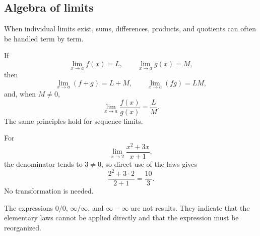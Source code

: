 \subsection{Algebra of limits}

When individual limits exist, sums, differences, products, and quotients can often be handled term by term.

\begin{theorembox}
If
\[
\lim_{x\to a}f(x)=L,
\qquad
\lim_{x\to a}g(x)=M,
\]
then
\[
\lim_{x\to a}(f+g)=L+M,
\qquad
\lim_{x\to a}(fg)=LM,
\]
and, when \(M\ne0\),
\[
\lim_{x\to a}\frac{f(x)}{g(x)}=\frac{L}{M}.
\]
The same principles hold for sequence limits.
\end{theorembox}

\begin{examplebox}
For
\[
\lim_{x\to2}\frac{x^2+3x}{x+1},
\]
the denominator tends to \(3\ne0\), so direct use of the laws gives
\[
\frac{2^2+3\cdot2}{2+1}=\frac{10}{3}.
\]
No transformation is needed.
\end{examplebox}

\begin{remarkbox}
The expressions \(0/0\), \(\infty/\infty\), and \(\infty-\infty\) are not results. They indicate that the elementary laws cannot be applied directly and that the expression must be reorganized.
\end{remarkbox}
